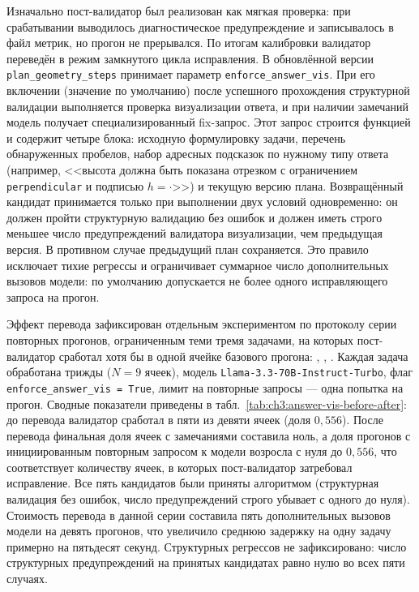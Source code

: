 Изначально пост-\allowbreak валидатор был реализован как мягкая проверка: при срабатывании выводилось диагностическое предупреждение и записывалось в файл метрик, но прогон не прерывался. По итогам калибровки валидатор переведён в режим замкнутого цикла исправления. В обновлённой версии \texttt{plan\_geometry\_steps} принимает параметр \texttt{enforce\_answer\_vis}. При его включении (значение по умолчанию) после успешного прохождения структурной валидации выполняется проверка визуализации ответа, и при наличии замечаний модель получает специализированный fix\nobreakdash-запрос. Этот запрос строится функцией  и содержит четыре блока: исходную формулировку задачи, перечень обнаруженных пробелов, набор адресных подсказок по нужному типу ответа (например, <<высота должна быть показана отрезком с ограничением \texttt{perpendicular} и подписью \(h = \cdot\)>>) и текущую версию плана. Возвращённый кандидат принимается только при выполнении двух условий одновременно: он должен пройти структурную валидацию без ошибок и должен иметь строго меньшее число предупреждений валидатора визуализации, чем предыдущая версия. В противном случае предыдущий план сохраняется. Это правило исключает тихие регрессы и ограничивает суммарное число дополнительных вызовов модели: по умолчанию допускается не более одного исправляющего запроса на прогон.

Эффект перевода зафиксирован отдельным экспериментом по протоколу серии повторных прогонов, ограниченным теми тремя задачами, на которых пост-\allowbreak валидатор сработал хотя бы в одной ячейке базового прогона: , , . Каждая задача обработана трижды (\(N = 9\) ячеек), модель \texttt{Llama-3.3-70B-Instruct-Turbo}, флаг \texttt{enforce\_answer\_vis = True}, лимит на повторные запросы --- одна попытка на прогон. Сводные показатели приведены в табл.~\ref{tab:ch3:answer-vis-before-after}: до перевода валидатор сработал в пяти из девяти ячеек (доля \(0{,}556\)). После перевода финальная доля ячеек с замечаниями составила ноль, а доля прогонов с инициированным повторным запросом к модели возросла с нуля до \(0{,}556\), что соответствует количеству ячеек, в которых пост-\allowbreak валидатор затребовал исправление. Все пять кандидатов были приняты алгоритмом (структурная валидация без ошибок, число предупреждений строго убывает с одного до нуля). Стоимость перевода в данной серии составила пять дополнительных вызовов модели на девять прогонов, что увеличило среднюю задержку на одну задачу примерно на пятьдесят секунд. Структурных регрессов не зафиксировано: число структурных предупреждений на принятых кандидатах равно нулю во всех пяти случаях.

